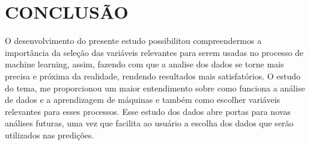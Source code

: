 \section{CONCLUSÃO}
O desenvolvimento do presente estudo possibilitou compreendermos a importância da seleção das variáveis relevantes para serem usadas no processo de machine learning, assim, fazendo com que a analise dos dados se torne mais precisa e próxima da realidade, rendendo resultados mais satisfatórios. O estudo do tema, me proporcionou um maior entendimento sobre como funciona a análise de dados e a aprendizagem de máquinas e também como escolher variáveis relevantes para esses processos. Esse estudo dos dados abre portas para novas análises futuras, uma vez que facilita ao usuário a escolha dos dados que serão utilizados nas predições.